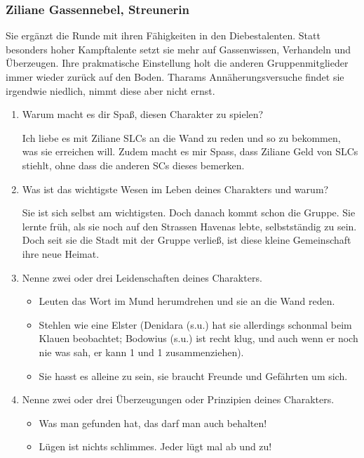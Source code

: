 \subsubsection{Ziliane Gassennebel, Streunerin}
Sie ergänzt die Runde mit ihren Fähigkeiten in den Diebestalenten. Statt besonders hoher Kampftalente setzt sie mehr auf Gassenwissen, Verhandeln und Überzeugen. Ihre prakmatische Einstellung holt die anderen Gruppenmitglieder immer wieder zurück auf den Boden. Tharams Annäherungsversuche findet sie irgendwie niedlich, nimmt diese aber nicht ernst.

\begin{enumerate}
  \item  Warum macht es dir Spaß, diesen Charakter zu spielen? 

Ich liebe es mit Ziliane SLCs an die Wand zu reden und so zu bekommen, was sie erreichen will. Zudem macht es mir Spass, dass Ziliane Geld von SLCs stiehlt, ohne dass die anderen SCs dieses bemerken.

  \item Was ist das wichtigste Wesen im Leben deines Charakters und warum?

Sie ist sich selbst am wichtigsten. Doch danach kommt schon die Gruppe. Sie lernte früh, als sie noch auf den Strassen Havenas lebte, selbstständig zu sein. Doch seit sie die Stadt mit der Gruppe verließ, ist diese kleine Gemeinschaft ihre neue Heimat.
 
  \item Nenne zwei oder drei Leidenschaften deines Charakters.

  \begin{itemize}
    \item Leuten das Wort im Mund herumdrehen und sie an die Wand reden.
    \item Stehlen wie eine Elster (Denidara (s.u.) hat sie allerdings schonmal beim Klauen beobachtet; Bodowius (s.u.) ist recht klug, und auch wenn er noch nie was sah, er kann 1 und 1 zusammenziehen).
    \item Sie hasst es alleine zu sein, sie braucht Freunde und Gefährten um sich. 
  \end{itemize}

  \item Nenne zwei oder drei Überzeugungen oder Prinzipien deines Charakters.

  \begin{itemize}
    \item Was man gefunden hat, das darf man auch behalten!
    \item Lügen ist nichts schlimmes. Jeder lügt mal ab und zu!
  \end{itemize}
\end{enumerate}

